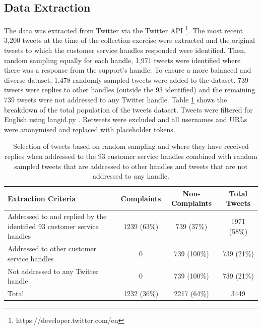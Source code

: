 \subsection{Data Extraction}
The data was extracted from Twitter via the Twitter API \footnote{https://developer.twitter.com/en}. The most recent 3,200 tweets at the time of the collection exercise were extracted and the original tweets to which the customer service handles responded were identified. Then, random sampling equally for each handle, 1,971 tweets were identified where there was a response from the support's handle. To ensure a more balanced and diverse dataset, 1,478 randomly sampled tweets were added to the dataset. 739 tweets were replies to other handles (outside the 93 identified) and the remaining 739 tweets were not addressed to any Twitter handle. Table \ref{tab: tweet_counts} shows the breakdown of the total population of the tweets dataset. Tweets were filtered for English using langid.py \cite{luiLangidPyOfftheshelf2012}. Retweets were excluded and all usernames and URLs were anonymised and replaced with placeholder tokens.
\begin{table}[ht]
    \captionsetup{font=small}
    \centering
    \begin{tabularx}{\textwidth}{|X|c|c|c|}
        \hline
        \rowcolor[gray]{0.7}
        \textbf{Extraction Criteria} & \textbf{Complaints} & \textbf{Non-Complaints} & \textbf{Total Tweets} \\
        \hline
        Addressed to and replied by the identified 93 customer service handles & 1239 \small{(63\%)}  & 739 \small{(37\%)}  & 1971 \small{(58\%)}  \\
        \hline
        Addressed to other customer service handles & 0 & 739 \small{(100\%)} & 739 \small{(21\%)}  \\
        \hline
        Not addressed to any Twitter handle & 0 & 739 \small{(100\%)} & 739 \small{(21\%)}  \\
        \hline    
        \rowcolor[gray]{0.9}
        Total & 1232 \small{(36\%)}  & 2217 \small{(64\%)}  & 3449 \\
        \hline
    \end{tabularx}
    \caption{Selection of tweets based on random sampling and where they have received replies when addressed to the 93 customer service handles combined with random sampled tweets that are addressed to other handles and tweets that are not addressed to any handle.}    
    \label{tab: tweet_counts}
\end{table}  

